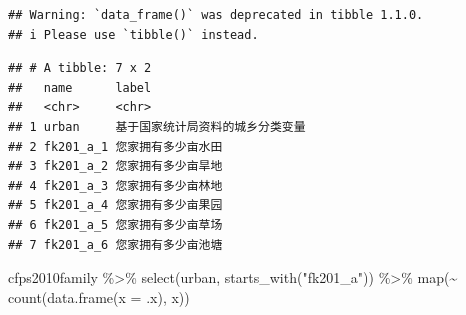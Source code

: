 \documentclass[
  oneside]{book}
\newenvironment{Shaded}{\begin{snugshade}}{\end{snugshade}}
\newcommand{\AttributeTok}[1]{\textcolor[rgb]{0.77,0.63,0.00}{#1}}
\newcommand{\FunctionTok}[1]{\textcolor[rgb]{0.00,0.00,0.00}{#1}}
\newcommand{\NormalTok}[1]{#1}
\newcommand{\SpecialCharTok}[1]{\textcolor[rgb]{0.00,0.00,0.00}{#1}}
\newcommand{\StringTok}[1]{\textcolor[rgb]{0.31,0.60,0.02}{#1}}
\begin{document}
\begin{verbatim}
## Warning: `data_frame()` was deprecated in tibble 1.1.0.
## i Please use `tibble()` instead.
\end{verbatim}

\begin{verbatim}
## # A tibble: 7 x 2
##   name      label                           
##   <chr>     <chr>                           
## 1 urban     基于国家统计局资料的城乡分类变量
## 2 fk201_a_1 您家拥有多少亩水田              
## 3 fk201_a_2 您家拥有多少亩旱地              
## 4 fk201_a_3 您家拥有多少亩林地              
## 5 fk201_a_4 您家拥有多少亩果园              
## 6 fk201_a_5 您家拥有多少亩草场              
## 7 fk201_a_6 您家拥有多少亩池塘
\end{verbatim}

\begin{Shaded}
\begin{Highlighting}[]
\NormalTok{cfps2010family }\SpecialCharTok{\%\textgreater{}\%}
  \FunctionTok{select}\NormalTok{(urban, }\FunctionTok{starts\_with}\NormalTok{(}\StringTok{"fk201\_a"}\NormalTok{)) }\SpecialCharTok{\%\textgreater{}\%}
  \FunctionTok{map}\NormalTok{(}\SpecialCharTok{\textasciitilde{}} \FunctionTok{count}\NormalTok{(}\FunctionTok{data.frame}\NormalTok{(}\AttributeTok{x =}\NormalTok{ .x), x))}
\end{Highlighting}
\end{Shaded}
\end{document}
